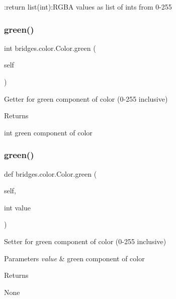 \+:return list(int)\+:R\+G\+BA values as list of ints from 0-\/255 

\mbox{\label{classbridges_1_1color_1_1_color_ac6548f00c79154d1f14109602eccb6dd}} 
\subsubsection{\texorpdfstring{green()}{green()}\hspace{0.1cm}{\footnotesize\ttfamily [1/2]}}
{\footnotesize\ttfamily  int bridges.\+color.\+Color.\+green (\begin{DoxyParamCaption}\item[{}]{self }\end{DoxyParamCaption})}



Getter for green component of color (0-\/255 inclusive) 

\begin{DoxyReturn}{Returns}


int green component of color 
\end{DoxyReturn}
\mbox{\label{classbridges_1_1color_1_1_color_a80e1af05cab786ba1626b0e6558b5008}} 
\subsubsection{\texorpdfstring{green()}{green()}\hspace{0.1cm}{\footnotesize\ttfamily [2/2]}}
{\footnotesize\ttfamily def bridges.\+color.\+Color.\+green (\begin{DoxyParamCaption}\item[{}]{self,  }\item[{int}]{value }\end{DoxyParamCaption})}



Setter for green component of color (0-\/255 inclusive) 


\begin{DoxyParams}{Parameters}
{\em value} & green component of color \\
\hline
\end{DoxyParams}
\begin{DoxyReturn}{Returns}


None 
\end{DoxyReturn}
\mbox{\label{classbridges_1_1color_1_1_color_acaeb134ddf621e96eadd79be530f62c2}} 
